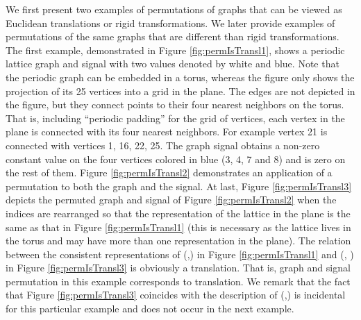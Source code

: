 \documentclass{article}
\begin{document}
 {We first present two examples of permutations of graphs that can be viewed as Euclidean translations or rigid transformations. We later provide examples of permutations of the same graphs that are different than rigid transformations. The first example, demonstrated in Figure \ref{fig:permIsTransl1}, shows a periodic lattice graph  and signal  with two values denoted by white and blue.} Note that the periodic graph can be embedded in a torus, whereas the figure only shows the projection of its 25 vertices into a  grid in the plane. The edges are not depicted in the figure, but they connect points to their four nearest neighbors on the torus. That is, including ``periodic padding'' for the  grid of vertices, each vertex in the plane is connected with its four nearest neighbors. For example vertex 21 is connected with vertices 1, 16, 22, 25. The graph signal obtains a non-zero constant value on the four vertices colored in blue (3, 4, 7 and 8) and is zero on the rest of them. Figure \ref{fig:permIsTransl2} demonstrates an application of a permutation  to both the graph and the signal. At last, Figure \ref{fig:permIsTransl3} depicts the permuted graph and signal of Figure \ref{fig:permIsTransl2} when the indices are rearranged so that the representation of the lattice in the plane is the same as that in Figure \ref{fig:permIsTransl1} (this is necessary as the lattice lives in the torus and may have more than one representation in the plane). The relation between the consistent representations of (,) in Figure \ref{fig:permIsTransl1} and (, ) in Figure \ref{fig:permIsTransl3} is obviously a translation. That is, graph and signal permutation in this example corresponds to translation. We remark that the fact that Figure \ref{fig:permIsTransl3} coincides with the description of (,) is incidental for this particular example and does not occur in the next example.
\end{document}
